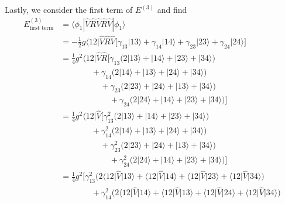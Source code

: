 \documentclass[a4paper]{article}
\newcommand{\nn}{\nonumber}
\begin{document}
Lastly, we consider the first term of $E^{(3)}$ and find
\begin{align}
E^{(3)}_\text{first term} &= \langle \phi_1 |\hat V \hat R \hat V \hat R \hat V |\phi_1\rangle \nn\\
%
&= -\frac{1}{2}g \big\langle 12 \big| \hat V \hat R \hat V \Big[ \gamma_{13}\big| 13\big\rangle + \gamma_{14}\big| 14\big\rangle +\gamma_{23} \big| 23\big\rangle + \gamma_{24} \big| 24\big\rangle \Big] \nn\\
%
&= \frac{1}{4}g^2 \big\langle 12 \big| \hat V \hat R \bigg[ \gamma_{13}\Big(2\big| 13\big\rangle + \big| 14\big\rangle + \big| 23\big\rangle + \big| 34\big\rangle \Big) \nn\\
& \ \ \ \ \ \ \ \ \ \ \ \ \ \ \ \ \ + \gamma_{14}\Big(2\big| 14\big\rangle + \big| 13\big\rangle + \big| 24\big\rangle + \big| 34\big\rangle \Big) \nn\\ 
& \ \ \ \ \ \ \ \ \ \ \ \ \ \ \ \ \ \ \ \ \ \ + \gamma_{23}\Big(2\big| 23\big\rangle + \big| 24\big\rangle + \big| 13\big\rangle + \big| 34\big\rangle \Big) \nn\\ 
& \ \ \ \ \ \ \ \ \ \ \ \ \ \ \ \ \ \ \ \ \ \ \ \ \ \ \ + \gamma_{24}\Big(2\big| 24\big\rangle + \big| 14\big\rangle + \big| 23\big\rangle + \big| 34\big\rangle \Big)\bigg] \nn\\ 
%
&= \frac{1}{4}g^2 \big\langle 12 \big| \hat V \bigg[ \gamma_{13}^2\Big(2\big| 13\big\rangle + \big| 14\big\rangle + \big| 23\big\rangle + \big| 34\big\rangle \Big) \nn\\
& \ \ \ \ \ \ \ \ \ \ \ \ \ \ \ \ \ + \gamma_{14}^2\Big(2\big| 14\big\rangle + \big| 13\big\rangle + \big| 24\big\rangle + \big| 34\big\rangle \Big) \nn\\ 
& \ \ \ \ \ \ \ \ \ \ \ \ \ \ \ \ \ \ \ \ \ \ + \gamma_{23}^2\Big(2\big| 23\big\rangle + \big| 24\big\rangle + \big| 13\big\rangle + \big| 34\big\rangle \Big) \nn\\ 
& \ \ \ \ \ \ \ \ \ \ \ \ \ \ \ \ \ \ \ \ \ \ \ \ \ \ \ + \gamma_{24}^2\Big(2\big| 24\big\rangle + \big| 14\big\rangle + \big| 23\big\rangle + \big| 34\big\rangle \Big)\bigg] \nn\\ 
%
&= \frac{1}{4}g^2 \bigg[ \gamma_{13}^2\Big(2\big\langle 12 \big| \hat V \big| 13\big\rangle + \big\langle 12 \big| \hat V \big| 14\big\rangle + \big\langle 12 \big| \hat V \big| 23\big\rangle + \big\langle 12 \big| \hat V \big| 34\big\rangle \Big) \nn\\
& \ \ \ \ \ \ \ \ \ \ \ \ \ \ \ \ \ + \gamma_{14}^2\Big(2\big\langle 12 \big| \hat V \big| 14\big\rangle + \big\langle 12 \big| \hat V \big| 13\big\rangle + \big\langle 12 \big| \hat V \big| 24\big\rangle + \big\langle 12 \big| \hat V \big| 34\big\rangle \Big) \nn\\ 

\end{align}
\end{document}
